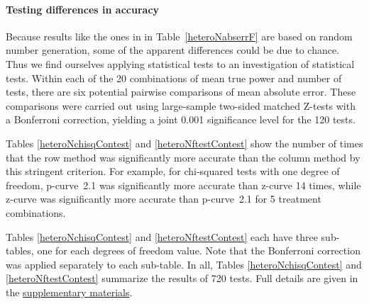 \documentclass[jou]{apa6} %
\begin{document}
\paragraph{Testing differences in accuracy} Because results like the ones in in Table~\ref{heteroNabserrF} are based on random number generation, some of the apparent differences could be due to chance. Thus we find ourselves applying statistical tests to an investigation of statistical tests.  Within each of the 20 combinations of mean true power and number of tests, there are six potential pairwise comparisons of mean absolute error. These comparisons were carried out using large-sample two-sided matched Z-tests with a Bonferroni correction, yielding a joint 0.001 significance level for the 120 tests.  

Tables \ref{heteroNchisqContest} and \ref{heteroNftestContest} show the number of times that the row method was significantly more accurate than the column method by this stringent criterion. For example, for chi-squared tests with one degree of freedom, p-curve~2.1 was significantly more accurate than z-curve 14 times, while z-curve was significantly more accurate than p-curve~2.1 for 5 treatment combinations. 

Tables \ref{heteroNchisqContest} and \ref{heteroNftestContest} each have three sub-tables, one for each degrees of freedom value. Note that the Bonferroni correction was applied separately to each sub-table. In all, Tables \ref{heteroNchisqContest} and \ref{heteroNftestContest} summarize the results of 720 tests. Full details are given in the \href{http://www.utstat.toronto.edu/~brunner/zcurve2018} {supplementary materials}. 
\end{document}
